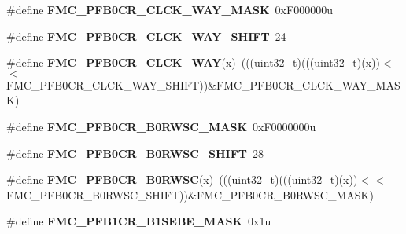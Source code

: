 \begin{DoxyCompactItemize}
\item 
\#define {\bfseries F\+M\+C\+\_\+\+P\+F\+B0\+C\+R\+\_\+\+C\+L\+C\+K\+\_\+\+W\+A\+Y\+\_\+\+M\+A\+SK}~0x\+F000000u\hypertarget{group__FMC__Register__Masks_ga84cd7c7d92e93b07f7c0f8d7cf003b98}{}\label{group__FMC__Register__Masks_ga84cd7c7d92e93b07f7c0f8d7cf003b98}

\item 
\#define {\bfseries F\+M\+C\+\_\+\+P\+F\+B0\+C\+R\+\_\+\+C\+L\+C\+K\+\_\+\+W\+A\+Y\+\_\+\+S\+H\+I\+FT}~24\hypertarget{group__FMC__Register__Masks_ga3629d923b58bcbe6202254d72c69fab9}{}\label{group__FMC__Register__Masks_ga3629d923b58bcbe6202254d72c69fab9}

\item 
\#define {\bfseries F\+M\+C\+\_\+\+P\+F\+B0\+C\+R\+\_\+\+C\+L\+C\+K\+\_\+\+W\+AY}(x)~(((uint32\+\_\+t)(((uint32\+\_\+t)(x))$<$$<$F\+M\+C\+\_\+\+P\+F\+B0\+C\+R\+\_\+\+C\+L\+C\+K\+\_\+\+W\+A\+Y\+\_\+\+S\+H\+I\+FT))\&F\+M\+C\+\_\+\+P\+F\+B0\+C\+R\+\_\+\+C\+L\+C\+K\+\_\+\+W\+A\+Y\+\_\+\+M\+A\+SK)\hypertarget{group__FMC__Register__Masks_ga891aff14fe52073658bd2479dffb4681}{}\label{group__FMC__Register__Masks_ga891aff14fe52073658bd2479dffb4681}

\item 
\#define {\bfseries F\+M\+C\+\_\+\+P\+F\+B0\+C\+R\+\_\+\+B0\+R\+W\+S\+C\+\_\+\+M\+A\+SK}~0x\+F0000000u\hypertarget{group__FMC__Register__Masks_ga6231856131c9747d8bf0b2bebcf4f172}{}\label{group__FMC__Register__Masks_ga6231856131c9747d8bf0b2bebcf4f172}

\item 
\#define {\bfseries F\+M\+C\+\_\+\+P\+F\+B0\+C\+R\+\_\+\+B0\+R\+W\+S\+C\+\_\+\+S\+H\+I\+FT}~28\hypertarget{group__FMC__Register__Masks_gafc34ff86025a1657d05d3f6a2de1ec7f}{}\label{group__FMC__Register__Masks_gafc34ff86025a1657d05d3f6a2de1ec7f}

\item 
\#define {\bfseries F\+M\+C\+\_\+\+P\+F\+B0\+C\+R\+\_\+\+B0\+R\+W\+SC}(x)~(((uint32\+\_\+t)(((uint32\+\_\+t)(x))$<$$<$F\+M\+C\+\_\+\+P\+F\+B0\+C\+R\+\_\+\+B0\+R\+W\+S\+C\+\_\+\+S\+H\+I\+FT))\&F\+M\+C\+\_\+\+P\+F\+B0\+C\+R\+\_\+\+B0\+R\+W\+S\+C\+\_\+\+M\+A\+SK)\hypertarget{group__FMC__Register__Masks_ga0741c38adeb4e926ab47b65f71ab369d}{}\label{group__FMC__Register__Masks_ga0741c38adeb4e926ab47b65f71ab369d}

\item 
\#define {\bfseries F\+M\+C\+\_\+\+P\+F\+B1\+C\+R\+\_\+\+B1\+S\+E\+B\+E\+\_\+\+M\+A\+SK}~0x1u\hypertarget{group__FMC__Register__Masks_ga420c5676807fc85197707ac092c58221}{}\label{group__FMC__Register__Masks_ga420c5676807fc85197707ac092c58221}


\end{DoxyCompactItemize}
